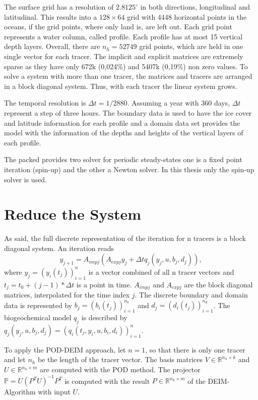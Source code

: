 The surface grid has a resolution of $2.8125 ^{\circ}$ in both directions, longitudinal and latitudinal. This results into a $128 \times 64$ 
grid with 4448 horizontal points in the oceans, if the grid points, where only land is, are left out. Each grid point represents a water column, called profile. Each profile has at most 15 vertical depth layers.
Overall, there are $ n_h = 52749 $ grid points, which are held in 
one single vector for each tracer. The implicit and explicit matrices are extremely sparse as they have only 672k (0,024\%) and 5407k (0,19\%) non zero values. To solve a system with more than one tracer, the matrices and tracers 
are arranged in a block diagonal system. Thus, with each tracer the linear system grows.

The temporal resolution is $\Delta t = 1/2880$. Assuming a year with 360 days, $\Delta t$ represent a step of three hours. The boundary data is used to have the ice cover and latitude information for each profile and a domain data set
provides the model with the information of the depths and heights of the vertical layers of each profile. 

The packed provides two solver for periodic steady-states one is a fixed point iteration (spin-up) and the other a Newton solver. In this thesis only the spin-up solver is used.


\section{Reduce the System}
As said, the full discrete representation of the iteration for n tracers is a block diagonal system. An iteration
reads
\begin{equation}\label{metos_equ}
y_{j+1} = A_{impj} (A_{expj} y_j + \Delta t q_j(y_j,u,b_j,d_j)),
\end{equation}
where $y_j = (y_i(t_j))^n_{i=1}$ is a vector combined of all n tracer vectors and $t_j = t_0 + (j-1)* \Delta t$ is a point in time.
$A_{impj}$ and $ A_{expj}$ are the
block diagonal matrices, interpolated for the time index $j$. The discrete boundary and domain data is represented by
$b_j = (b_i(t_j))^{n_b}_{i=1}$ and $d_j = (d_i(t_j))^{n_d}_{i=1}$. The biogeochemical model $q_j$ is described by
$q_j(y_j,u,b_j,d_j) = (q_i(t_j,y_i,u,b_i,d_i))^n_{i=1}$.

To apply the POD-DEIM approach, let $n=1$, so that there is only one tracer and let $n_h$ be the length of the tracer vector. The basis matrices $V \in \mathbb{R}^{n_h \times k}$
and $U \in \mathbb{R}^{n_h \times m}$ are computed with the POD method. The projector $\mathbb{P} = U(P^TU)^{-1}P^T$ is computed
with the result $P \in \mathbb{R}^{n_h \times m}$ of the DEIM-Algorithm with input $U$.

